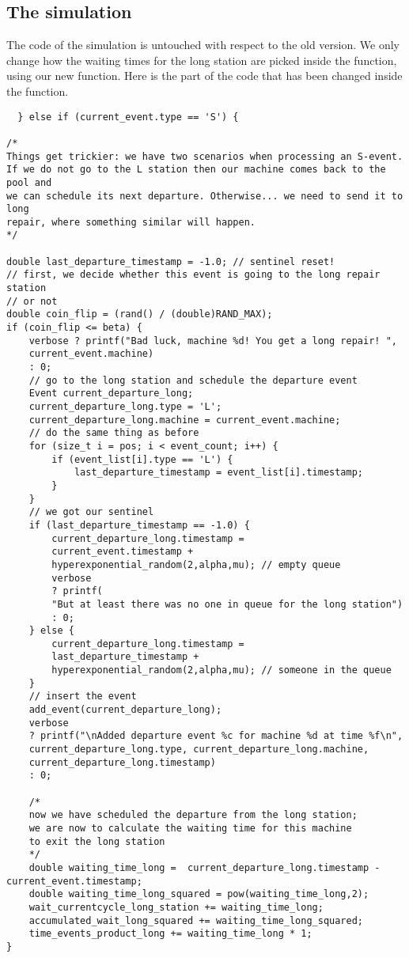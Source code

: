 \documentclass[12pt]{article}
\begin{document}
\subsection{The simulation}
The code of the simulation is untouched with respect to the old version. We only change how the waiting times for the long station are picked inside the  function, using our new  function. Here is the part of the code that has been changed inside the  function.
\begin{lstlisting}
  } else if (current_event.type == 'S') {

/*
Things get trickier: we have two scenarios when processing an S-event.
If we do not go to the L station then our machine comes back to the pool and
we can schedule its next departure. Otherwise... we need to send it to long
repair, where something similar will happen.
*/

double last_departure_timestamp = -1.0; // sentinel reset!
// first, we decide whether this event is going to the long repair station
// or not
double coin_flip = (rand() / (double)RAND_MAX);
if (coin_flip <= beta) {
	verbose ? printf("Bad luck, machine %d! You get a long repair! ",
	current_event.machine)
	: 0;
	// go to the long station and schedule the departure event
	Event current_departure_long;
	current_departure_long.type = 'L';
	current_departure_long.machine = current_event.machine;
	// do the same thing as before
	for (size_t i = pos; i < event_count; i++) {
		if (event_list[i].type == 'L') {
			last_departure_timestamp = event_list[i].timestamp;
		}
	}
	// we got our sentinel
	if (last_departure_timestamp == -1.0) {
		current_departure_long.timestamp =
		current_event.timestamp +
		hyperexponential_random(2,alpha,mu); // empty queue
		verbose
		? printf(
		"But at least there was no one in queue for the long station")
		: 0;
	} else {
		current_departure_long.timestamp =
		last_departure_timestamp +
		hyperexponential_random(2,alpha,mu); // someone in the queue
	}
	// insert the event
	add_event(current_departure_long);
	verbose
	? printf("\nAdded departure event %c for machine %d at time %f\n",
	current_departure_long.type, current_departure_long.machine,
	current_departure_long.timestamp)
	: 0;
	
	/*
	now we have scheduled the departure from the long station;
	we are now to calculate the waiting time for this machine
	to exit the long station
	*/
	double waiting_time_long =  current_departure_long.timestamp - current_event.timestamp;
	double waiting_time_long_squared = pow(waiting_time_long,2);
	wait_currentcycle_long_station += waiting_time_long;
	accumulated_wait_long_squared += waiting_time_long_squared;
	time_events_product_long += waiting_time_long * 1;
}
\end{lstlisting}
\end{document}
